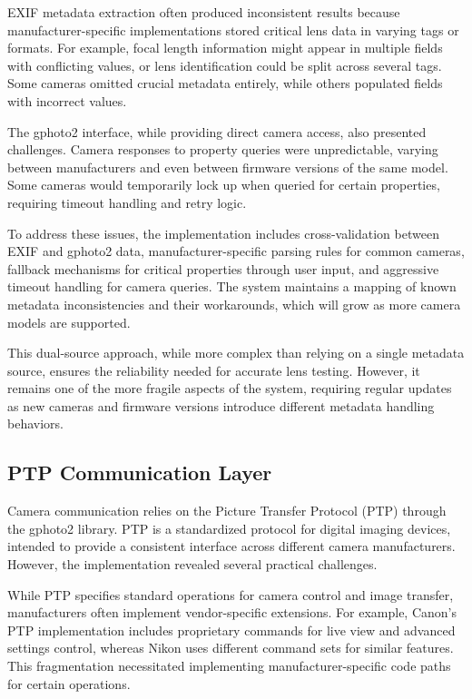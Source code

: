 EXIF metadata extraction often produced inconsistent results because manufacturer-specific implementations stored critical lens data in varying tags or formats. For example, focal length information might appear in multiple fields with conflicting values, or lens identification could be split across several tags. Some cameras omitted crucial metadata entirely, while others populated fields with incorrect values.

The gphoto2 interface, while providing direct camera access, also presented challenges. Camera responses to property queries were unpredictable, varying between manufacturers and even between firmware versions of the same model. Some cameras would temporarily lock up when queried for certain properties, requiring timeout handling and retry logic.

To address these issues, the implementation includes cross-validation between EXIF and gphoto2 data, manufacturer-specific parsing rules for common cameras, fallback mechanisms for critical properties through user input, and aggressive timeout handling for camera queries. The system maintains a mapping of known metadata inconsistencies and their workarounds, which will grow as more camera models are supported.

This dual-source approach, while more complex than relying on a single metadata source, ensures the reliability needed for accurate lens testing. However, it remains one of the more fragile aspects of the system, requiring regular updates as new cameras and firmware versions introduce different metadata handling behaviors.

\subsection{PTP Communication Layer}

Camera communication relies on the Picture Transfer Protocol (PTP) through the gphoto2 library. PTP is a standardized protocol for digital imaging devices, intended to provide a consistent interface across different camera manufacturers. However, the implementation revealed several practical challenges.

While PTP specifies standard operations for camera control and image transfer, manufacturers often implement vendor-specific extensions. For example, Canon's PTP implementation includes proprietary commands for live view and advanced settings control, whereas Nikon uses different command sets for similar features. This fragmentation necessitated implementing manufacturer-specific code paths for certain operations.

